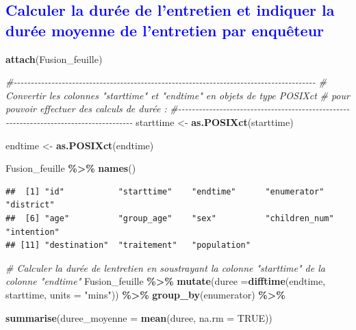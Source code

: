 \documentclass[
]{article}
\newenvironment{Shaded}{\begin{snugshade}}{\end{snugshade}}
\newcommand{\AttributeTok}[1]{\textcolor[rgb]{0.13,0.29,0.53}{#1}}
\newcommand{\CommentTok}[1]{\textcolor[rgb]{0.56,0.35,0.01}{\textit{#1}}}
\newcommand{\ConstantTok}[1]{\textcolor[rgb]{0.56,0.35,0.01}{#1}}
\newcommand{\FunctionTok}[1]{\textcolor[rgb]{0.13,0.29,0.53}{\textbf{#1}}}
\newcommand{\NormalTok}[1]{#1}
\newcommand{\OtherTok}[1]{\textcolor[rgb]{0.56,0.35,0.01}{#1}}
\newcommand{\SpecialCharTok}[1]{\textcolor[rgb]{0.81,0.36,0.00}{\textbf{#1}}}
\newcommand{\StringTok}[1]{\textcolor[rgb]{0.31,0.60,0.02}{#1}}
\begin{document}
\textcolor{blue}{\subsection{Calculer la durée de l’entretien et indiquer la durée moyenne de l’entretien par enquêteur}}

\begin{Shaded}
\begin{Highlighting}[]
\FunctionTok{attach}\NormalTok{(Fusion\_feuille)}

\CommentTok{\#{-}{-}{-}{-}{-}{-}{-}{-}{-}{-}{-}{-}{-}{-}{-}{-}{-}{-}{-}{-}{-}{-}{-}{-}{-}{-}{-}{-}{-}{-}{-}{-}{-}{-}{-}{-}{-}{-}{-}{-}{-}{-}{-}{-}{-}{-}{-}{-}{-}{-}{-}{-}{-}{-}{-}{-}{-}{-}{-}{-}{-}{-}{-}{-}{-}{-}{-}{-}{-}{-}{-}{-}{-}{-}{-}{-}{-}{-}{-}{-}{-}{-}{-}{-}{-}{-}{-}{-}}
\CommentTok{\# Convertir les colonnes "starttime" et "endtime" en objets de type POSIXct }
\CommentTok{\# pour pouvoir effectuer des calculs de durée :}
\CommentTok{\#{-}{-}{-}{-}{-}{-}{-}{-}{-}{-}{-}{-}{-}{-}{-}{-}{-}{-}{-}{-}{-}{-}{-}{-}{-}{-}{-}{-}{-}{-}{-}{-}{-}{-}{-}{-}{-}{-}{-}{-}{-}{-}{-}{-}{-}{-}{-}{-}{-}{-}{-}{-}{-}{-}{-}{-}{-}{-}{-}{-}{-}{-}{-}{-}{-}{-}{-}{-}{-}{-}{-}{-}{-}{-}{-}{-}{-}{-}{-}{-}{-}{-}{-}{-}{-}{-}{-}}
\NormalTok{starttime }\OtherTok{\textless{}{-}} \FunctionTok{as.POSIXct}\NormalTok{(starttime)}

\NormalTok{endtime }\OtherTok{\textless{}{-}} \FunctionTok{as.POSIXct}\NormalTok{(endtime)}

\NormalTok{Fusion\_feuille }\SpecialCharTok{\%\textgreater{}\%} \FunctionTok{names}\NormalTok{()}
\end{Highlighting}
\end{Shaded}

\begin{verbatim}
##  [1] "id"           "starttime"    "endtime"      "enumerator"   "district"    
##  [6] "age"          "group_age"    "sex"          "children_num" "intention"   
## [11] "destination"  "traitement"   "population"
\end{verbatim}

\begin{Shaded}
\begin{Highlighting}[]
\CommentTok{\# Calculer la durée de l\textquotesingle{}entretien en soustrayant la colonne "starttime" de la colonne "endtime"}
\NormalTok{Fusion\_feuille }\SpecialCharTok{\%\textgreater{}\%} 
  \FunctionTok{mutate}\NormalTok{(}\AttributeTok{duree =}\FunctionTok{difftime}\NormalTok{(endtime, starttime, }\AttributeTok{units =} \StringTok{"mins"}\NormalTok{)) }\SpecialCharTok{\%\textgreater{}\%} 
  \FunctionTok{group\_by}\NormalTok{(enumerator) }\SpecialCharTok{\%\textgreater{}\%} 
  
  \FunctionTok{summarise}\NormalTok{(}\AttributeTok{duree\_moyenne =} \FunctionTok{mean}\NormalTok{(duree, }\AttributeTok{na.rm =} \ConstantTok{TRUE}\NormalTok{))}
\end{Highlighting}
\end{Shaded}
\end{document}
